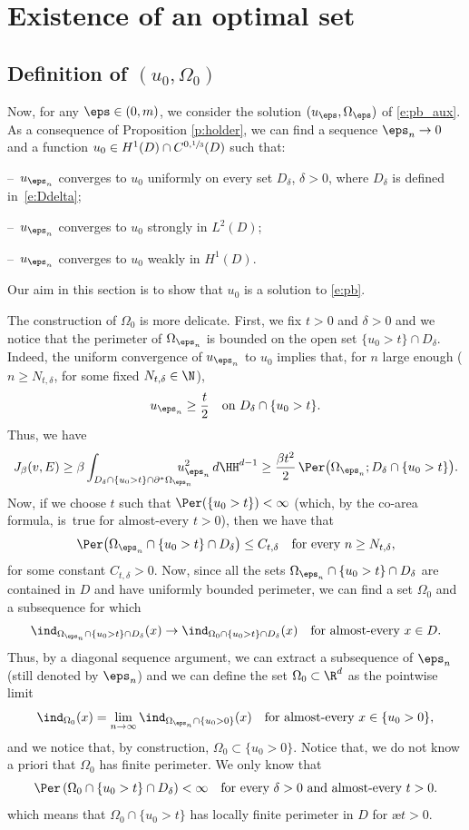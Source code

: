 \section{Existence of an optimal set}\label{s:existence}

\subsection{Definition of $(u_0,\Omega_0)$}\label{sub:construction}
Now, for any $\eps\in(0,m)$, we consider the solution $(u_\eps,\Omega_\eps)$ of \eqref{e:pb_aux}. As a consequence of Proposition \eqref{p:holder}, we can find a sequence $\eps_n\to0$ and a function $u_0\in H^1(D)\cap C^{0,\sfrac13}(D)$ such that:

--\, $u_{\eps_n}$ converges to $u_0$ uniformly on every set $D_\delta$, $\delta\!>\!0$, where $D_\delta$ is defined in~\eqref{e:Ddelta};

--\, $u_{\eps_n}$ converges to $u_0$ strongly in $L^2(D)$;

--\, $u_{\eps_n}$ converges to $u_0$ weakly in $H^1(D)$.
\par\nopagebreak\noindent
Our aim in this section is to show that $u_0$ is a solution to \eqref{e:pb}.

The construction of $\Omega_0$ is more delicate. First, we fix $t>0$ and $\delta>0$ and we notice that the perimeter of $\Omega_{\eps_n}$ is bounded on the open set $\{u_0>t\}\cap D_\delta$. Indeed, the uniform convergence of $u_{\eps_n}$ to $u_0$ implies that, for $n$ large enough ($n\ge N_{t,\delta}$, for some fixed $N_{t,\delta}\in\N$),
\[u_{\eps_n}\ge \frac{t}{2}\quad\text{on } D_\delta\cap \{u_0>t\}.\]
Thus, we have
\[J_\beta(v,E)\ge \beta \int_{D_\delta\cap \{u_0>t\}\cap\partial^\ast\Omega_{\eps_n}}\hspace*{-5mm}u_{\eps_n}^2\,d\HH^{d-1}\ge \frac{\beta t^2}2\,\Per\big(\Omega_{\eps_n};D_\delta\cap \{u_0>t\}\big).\]
Now, if we choose $t$ such that $\Per(\{u_0>t\})<\infty$ (which, by the co-area formula, is~true for almost-every $t>0$), then we have that
\[\Per\big(\Omega_{\eps_n}\cap \{u_0>t\}\cap D_{\delta}\big)\le C_{t,\delta}\quad\text{for every } n\ge N_{t,\delta},\]
for some constant $C_{t,\delta}>0$. Now, since all the sets $\Omega_{\eps_n}\cap \{u_0>t\}\cap D_{\delta}$ are contained in $D$ and have uniformly bounded perimeter, we can find a set $\Omega_0$ and a subsequence for which
\[\ind_{\Omega_{\eps_n}\cap \{u_0>t\}\cap D_{\delta}}(x)\to \ind_{\Omega_{0}\cap \{u_0>t\}\cap D_{\delta}}(x)\quad\text{for almost-every } x\in D.\]
Thus, by a diagonal sequence argument, we can extract a subsequence of $\eps_n$ (still denoted by $\eps_n$) and we can define the set $\Omega_0\subset\R^d$ as the pointwise limit
\[\ind_{\Omega_0}(x)=\lim_{n\to\infty}\ind_{\Omega_{\eps_n}\cap\{u_0>0\}}(x)\quad\text{for almost-every } x\in \{u_0>0\},\]
and we notice that, by construction, $\Omega_0\subset\{u_0>0\}$.
Notice that, we do not know a priori that $\Omega_0$ has finite perimeter. We only know that
\[\Per\,(\Omega_0\cap\{u_0>t\}\cap D_\delta)<\infty\quad\text{for every }\delta>0 \text{ and almost-every } t>0.\]
which means that $\Omega_0\cap\{u_0>t\}$ has locally finite perimeter in $D$ for \ae $t>0$.
